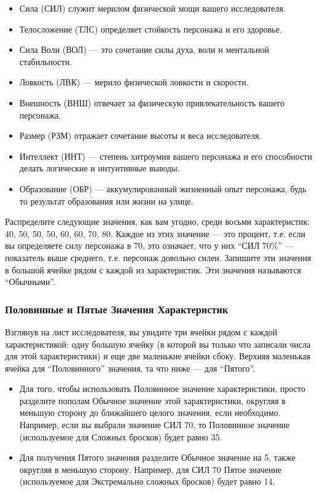 \documentclass[letterpaper,twocolumn,openany, twoside, 11pt, usenames]{cocbook}
\begin{document}
\begin{itemize}[leftmargin=4mm]
  \item Сила (СИЛ) служит мерилом физической мощи вашего исследователя.
  \item Телосложение (ТЛС) определяет стойкость персонажа и его здоровье.
  \item Сила Воли (ВОЛ) --- это сочетание силы духа, воли и ментальной стабильности.
  \item Ловкость (ЛВК) --- мерило физической ловкости и скорости.
  \item Внешность (ВНШ) отвечает за физическую привлекательность вашего персонажа.
  \item Размер (РЗМ) отражает сочетание высоты и веса исследователя.
  \item Интеллект (ИНТ) --- степень хитроумия вашего персонажа и его способности делать логические и интуитивные выводы.
  \item Образование (ОБР) --- аккумулированный жизненный опыт персонажа, будь то результат образования или жизни на улице.
\end{itemize}

Распределите следующие значения, как вам угодно, среди восьми характеристик: 40, 50, 50, 50, 60, 60, 70, 80. Каждое из этих значение --- это процент, т.е. если вы определяете силу персонажа в 70, это означает, что у них ``СИЛ 70\%'' --- показатель выше среднего, т.е. персонаж довольно силен. Запишите эти значения в большой ячейке рядом с каждой из характеристик. Эти значения называются ``Обычными''.

\subsubsection*{\nohyphens{Половинные и Пятые Значения Характеристик}}

Взглянув на лист исследователя, вы увидите три ячейки рядом с каждой характеристикой: одну большую ячейку (в которой вы только что записали числа для этой характеристики) и еще две маленькие ячейки сбоку. Верхняя маленькая ячейка для ``Половинного'' значения, та что ниже --- для ``Пятого''.

\begin{itemize}[leftmargin=4mm]
  \item Для того, чтобы использовать Половинное значение характеристики, просто разделите пополам Обычное значение этой характеристики, округляя в меньшую сторону до ближайшего целого значения, если необходимо. Например, если вы выбрали значение СИЛ 70, то Половинное значение (используемое для Сложных бросков) будет равно 35.
  \item Для получения Пятого значения разделите Обычное значение на 5, также округляя в меньшую сторону. Например, для СИЛ 70 Пятое значение (используемое для Экстремально сложных бросков) будет равно 14.
\end{itemize}
\end{document}
